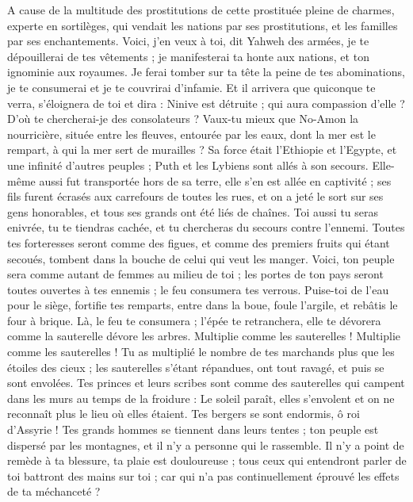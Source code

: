\begin{multicols}{2}
A cause de la multitude des prostitutions de cette prostituée pleine de charmes, experte en sortilèges, qui vendait les nations par ses prostitutions, et les familles par ses enchantements.
Voici, j'en veux à toi, dit Yahweh des armées, je te dépouillerai de tes vêtements ; je manifesterai ta honte aux nations, et ton ignominie aux royaumes.
Je ferai tomber sur ta tête la peine de tes abominations, je te consumerai et je te couvrirai d'infamie.
Et il arrivera que quiconque te verra, s'éloignera de toi et dira : Ninive est détruite ; qui aura compassion d'elle ? D'où te chercherai-je des consolateurs ?
Vaux-tu mieux que No-Amon la nourricière, située entre les fleuves, entourée par les eaux, dont la mer est le rempart, à qui la mer sert de murailles ?
Sa force était l’Ethiopie et l'Egypte, et une infinité d'autres peuples ; Puth et les Lybiens sont allés à son secours.
Elle-même aussi fut transportée hors de sa terre, elle s'en est allée en captivité ; ses fils furent écrasés aux carrefours de toutes les rues, et on a jeté le sort sur ses gens honorables, et tous ses grands ont été liés de chaînes.
Toi aussi tu seras enivrée, tu te tiendras cachée, et tu chercheras du secours contre l'ennemi.
Toutes tes forteresses seront comme des figues, et comme des premiers fruits qui étant secoués, tombent dans la bouche de celui qui veut les manger.
Voici, ton peuple sera comme autant de femmes au milieu de toi ; les portes de ton pays seront toutes ouvertes à tes ennemis ; le feu consumera tes verrous.
Puise-toi de l'eau pour le siège, fortifie tes remparts, entre dans la boue, foule l'argile, et rebâtis le four à brique.
Là, le feu te consumera ; l'épée te retranchera, elle te dévorera comme la sauterelle dévore les arbres. Multiplie comme les sauterelles ! Multiplie comme les sauterelles !
Tu as multiplié le nombre de tes marchands plus que les étoiles des cieux ; les sauterelles s'étant répandues, ont tout ravagé, et puis se sont envolées.
Tes princes et leurs scribes sont comme des sauterelles qui campent dans les murs au temps de la froidure : Le soleil paraît, elles s’envolent et on ne reconnaît plus le lieu où elles étaient.
Tes bergers se sont endormis, ô roi d'Assyrie ! Tes grands hommes se tiennent dans leurs tentes ; ton peuple est dispersé par les montagnes, et il n'y a personne qui le rassemble.
Il n'y a point de remède à ta blessure, ta plaie est douloureuse ; tous ceux qui entendront parler de toi battront des mains sur toi ; car qui n'a pas continuellement éprouvé les effets de ta méchanceté ?
\PPE{}
\end{multicols}
